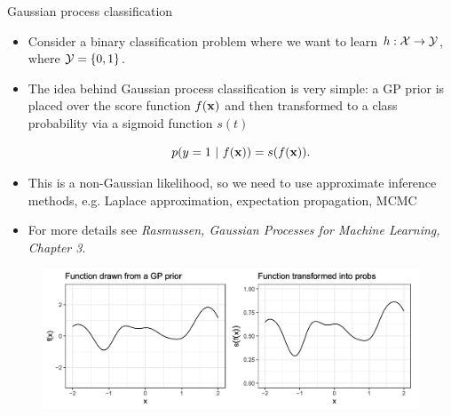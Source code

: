 








\begin{vbframe}{Gaussian process classification}

\begin{itemize}
\item Consider a binary classification problem where we want to learn $h: \mathcal{X} \to \mathcal{Y}$, where $\mathcal{Y} = \{0, 1\}$. 
\item The idea behind Gaussian process classification is very simple: a GP prior is placed over the score function $f(\mathbf{x})$ and then transformed to a class probability via a sigmoid function $s(t)$

$$
p(y = 1 ~|~ f(\mathbf{x}) ) = s(f(\mathbf{x})).
$$

\item This is a non-Gaussian likelihood, so we need to use approximate inference methods, e.g. Laplace approximation, expectation propagation, MCMC 
\item For more details see \emph{Rasmussen, Gaussian Processes for Machine Learning, Chapter 3}.

\end{itemize}

\vspace*{1cm}

\begin{figure}
\includegraphics[width=1\textwidth]{figure_man/gp-classification.png}
\end{figure}

\framebreak 




\end{vbframe}
